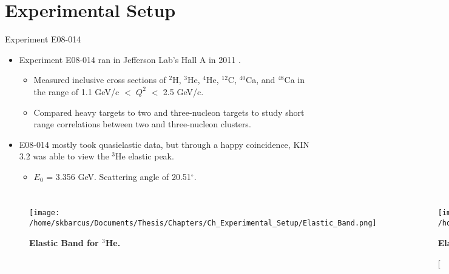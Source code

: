 \documentclass[10pt]{beamer}
\begin{document}
\section{Experimental Setup}

\begin{frame}[fragile]{Experiment E08-014}
	\begin{itemize}
		\item Experiment \alert{E08-014} ran in Jefferson Lab's Hall A in 2011 \cite{Thesis:Ye}.
			\begin{itemize}
				\item[--] Measured inclusive cross sections of $^2$H, \alert{$^3$He}, $^4$He, $^{12}$C, $^{40}$Ca, and $^{48}$Ca in the range of 1.1 GeV/c $<$ $Q^2$ $<$ 2.5 GeV/c.
				\item[--] Compared heavy targets to two and three-nucleon targets to study \alert{short range correlations} between two and three-nucleon clusters.
			\end{itemize}
		\pause
		\item E08-014 mostly took quasielastic data, but through a happy coincidence, \alert{KIN 3.2} was able to view the $^3$He elastic peak.
			\begin{itemize}
				\item[--] $E_0$ = \alert{3.356 GeV}. Scattering angle of \alert{20.51$^{\circ}$}.
			\end{itemize}
	\end{itemize}
	
	\begin{columns}[T,onlytextwidth]   	
	
	\pause
	\begin{figure}[!ht]
	\begin{center}
	\texttt{[image: /home/skbarcus/Documents/Thesis/Chapters/Ch\_Experimental\_Setup/Elastic\_Band.png]}
	\end{center}
	\caption{
	{\bf{Elastic Band for $^3$He.}} }
	\label{fig:elastic_band}
	\end{figure}
	
	
	\pause
	\begin{figure}[!ht]
	\begin{center}
	\texttt{[image: /home/skbarcus/Documents/Thesis/Chapters/Ch\_Experimental\_Setup/Elastic\_Xbj.png]}
	\end{center}
	\caption[\bf{Elastic Peak in $x_{Bj}$}]{
	{\bf{Elastic Peak in $x_{Bj}$.}} }
	\label{fig:elastic_xbj}
	\end{figure}

	\end{columns}
	
\end{frame}
\end{document}
